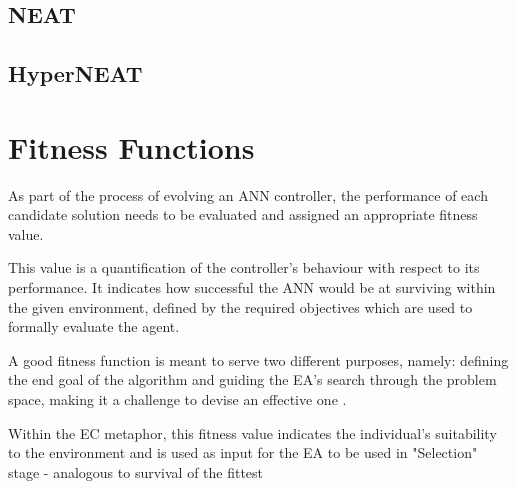 \subsection{NEAT}


\subsection{HyperNEAT}


\section{Fitness Functions}


As part of the process of evolving an ANN controller, the performance of each candidate solution needs to be evaluated and assigned an appropriate fitness value. 

This value is a quantification of the controller's behaviour with respect to its performance. It indicates how successful the ANN would be at surviving within the given environment, defined by the required objectives which are used to formally evaluate the agent.

A good fitness function is meant to serve two different purposes, namely: defining the end goal of the algorithm and guiding the EA's search through the problem space, making it a challenge to devise an effective one \cite{RefWorks:9}.

Within the EC metaphor, this fitness value indicates the individual's suitability to the environment and is used as input for the EA to be used in "Selection" stage  - analogous to survival of the fittest




